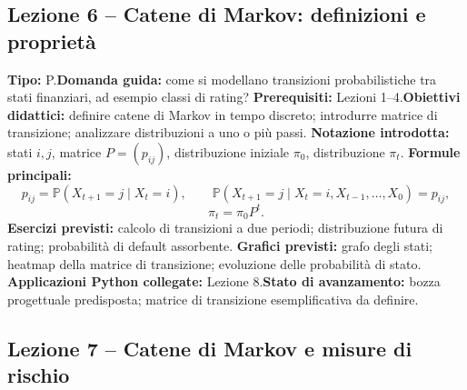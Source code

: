 \documentclass[12pt,a4paper]{article}%
\begin{document}
\subsection{Lezione 6 -- Catene di Markov: definizioni e propriet\`{a}}

\textbf{Tipo:} P.\newline\textbf{Domanda guida:} come si modellano transizioni
probabilistiche tra stati finanziari, ad esempio classi di rating?\newline%
\textbf{Prerequisiti:} Lezioni 1--4.\newline\textbf{Obiettivi didattici:}
definire catene di Markov in tempo discreto; introdurre matrice di
transizione; analizzare distribuzioni a uno o pi\`{u} passi.\newline%
\textbf{Notazione introdotta:} stati $i,j$, matrice $P=(p_{ij})$,
distribuzione iniziale $\pi_{0}$, distribuzione $\pi_{t}$.\newline%
\textbf{Formule principali:}
\[
p_{ij}=\mathbb{P}(X_{t+1}=j\mid X_{t}=i), \qquad\mathbb{P}(X_{t+1}=j\mid
X_{t}=i,X_{t-1},\ldots,X_{0})=p_{ij},
\]
\[
\pi_{t}=\pi_{0} P^{t}.
\]
\textbf{Esercizi previsti:} calcolo di transizioni a due periodi;
distribuzione futura di rating; probabilit\`{a} di default assorbente.\newline%
\textbf{Grafici previsti:} grafo degli stati; heatmap della matrice di
transizione; evoluzione delle probabilit\`{a} di stato.\newline%
\textbf{Applicazioni Python collegate:} Lezione 8.\newline\textbf{Stato di
avanzamento:} bozza progettuale predisposta; matrice di transizione
esemplificativa da definire.

\subsection{Lezione 7 -- Catene di Markov e misure di rischio}
\end{document}
